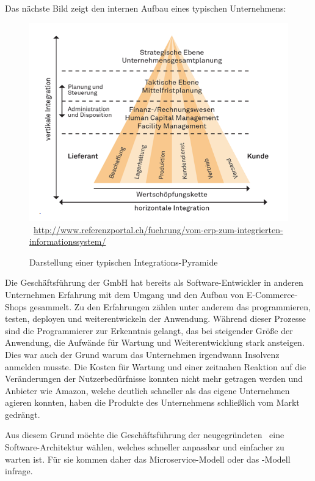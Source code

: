 Das nächste Bild zeigt den internen Aufbau eines typischen Unternehmens:
\newpage
\begin{figure}[htb]
    \centering 
    \includegraphics[width=\linewidth]{content/images/integrations-pyramide}\
    \quelle\url{http://www.referenzportal.ch/fuehrung/vom-erp-zum-integrierten-informationssystem/}
    \caption[Darstellung einer typischen Integrations-Pyramide]{Darstellung einer typischen Integrations-Pyramide\\}
    \label{fig:integrations-pyramide} 
\end{figure} 

Die Geschäftsführung der GmbH hat bereits als Software-Entwickler in anderen Unternehmen Erfahrung mit dem Umgang und den Aufbau von E-Commerce-Shops gesammelt. Zu den Erfahrungen zählen unter anderem das programmieren, testen, deployen und weiterentwickeln der Anwendung. Während dieser Prozesse sind die Programmierer zur Erkenntnis gelangt, das bei steigender Größe der Anwendung, die Aufwände für Wartung und Weiterentwicklung stark ansteigen. Dies war auch der Grund warum das Unternehmen irgendwann Insolvenz anmelden musste. Die Kosten für Wartung und einer zeitnahen Reaktion auf die Veränderungen der Nutzerbedürfnisse konnten nicht mehr getragen werden und Anbieter wie Amazon, welche deutlich schneller als das eigene Unternehmen agieren konnten, haben die Produkte des Unternehmens schließlich vom Markt gedrängt.

Aus diesem Grund möchte die Geschäftsführung der neugegründeten \gmbh\ eine Software-Architektur wählen, welches schneller anpassbar und einfacher zu warten ist. Für sie kommen daher das Microservice-Modell oder das \SOA -Modell infrage.

